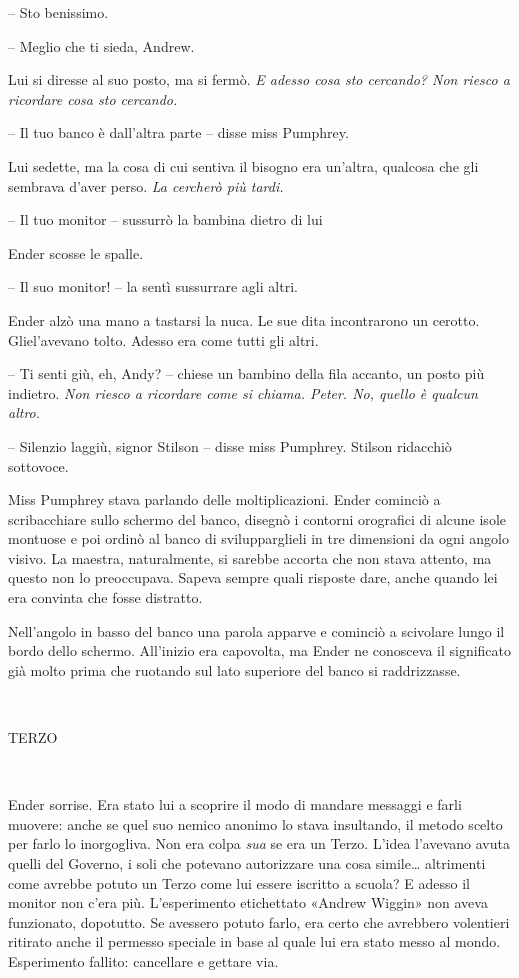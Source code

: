 {-- Sto benissimo.}

{-- Meglio che ti sieda, Andrew.}

{Lui si diresse al suo posto, ma si fermò. \emph{E adesso cosa sto
		cercando? Non riesco a ricordare cosa sto cercando.}}

{-- Il tuo banco è dall'altra parte -- disse miss Pumphrey.}

{Lui sedette, ma la cosa di cui sentiva il bisogno era un'altra,
	qualcosa che gli sembrava d'aver perso. \emph{La cercherò più tardi.}}

{-- Il tuo monitor -- sussurrò la bambina dietro di lui}

{Ender scosse le spalle.}

{-- Il suo monitor! -- la sentì sussurrare agli altri.}

{Ender alzò una mano a tastarsi la nuca. Le sue dita incontrarono un
	cerotto. Gliel'avevano tolto. Adesso era come tutti gli altri.}

{-- Ti senti giù, eh, Andy? -- chiese un bambino della fila accanto, un
	posto più indietro. \emph{Non riesco a ricordare come si chiama. Peter.
		No, quello è qualcun altro.}}

{-- Silenzio laggiù, signor Stilson -- disse miss Pumphrey. Stilson
	ridacchiò sottovoce.}

{Miss Pumphrey stava parlando delle moltiplicazioni. Ender cominciò a
	scribacchiare sullo schermo del banco, disegnò i contorni orografici di
	alcune isole montuose e poi ordinò al banco di svilupparglieli in tre
	dimensioni da ogni angolo visivo. La maestra, naturalmente, si sarebbe
	accorta che non stava attento, ma questo non lo preoccupava. Sapeva
	sempre quali risposte dare, anche quando lei era convinta che fosse
	distratto.}

{Nell'angolo in basso del banco una parola apparve e cominciò a
	scivolare lungo il bordo dello schermo. All'inizio era capovolta, ma
	Ender ne conosceva il significato già molto prima che ruotando sul lato
	superiore del banco si raddrizzasse.}

{~}

{TERZO}

{~}

{Ender sorrise. Era stato lui a scoprire il modo di mandare messaggi e
	farli muovere: anche se quel suo nemico anonimo lo stava insultando, il
	metodo scelto per farlo lo inorgogliva. Non era colpa \emph{sua} se era
	un Terzo. L'idea l'avevano avuta quelli del Governo, i soli che potevano
	autorizzare una cosa simile\ldots{} altrimenti come avrebbe potuto un
	Terzo come lui essere iscritto a scuola? E adesso il monitor non c'era
	più. L'esperimento etichettato «Andrew Wiggin» non aveva funzionato,
	dopotutto. Se avessero potuto farlo, era certo che avrebbero volentieri
	ritirato anche il permesso speciale in base al quale lui era stato messo
	al mondo. Esperimento fallito: cancellare e gettare via.}

